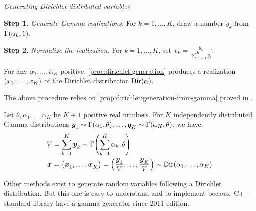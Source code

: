 \begin{proc}\label{proc:dirichlet:generation}
\emph{Generating Dirichlet distributed variables}

\textbf{Step 1.} \emph{Generate Gamma realizations.} For $k=1,\ldots,K$, draw a number $y_k$ from $\Gamma\bracket{\alpha_k,1}$.

\textbf{Step 2.} \emph{Normalize the realization.} For $k=1,\ldots,K$, set $x_k=\frac{y_k}{\sum_{\ell=1}^K y_{\ell}}$.
\end{proc}


\begin{prop}
For any $\alpha_1,\ldots,\alpha_K$ positive, \cref{proc:dirichlet:generation} produces a realization $\bracket{x_1,\ldots,x_K}$ of the Dirichlet distribution $\Dir\bracket{\alpha}$.
\end{prop}


The above procedure relies on \cref{prop:dirichlet:generation-from-gamma} proved in \cite{Devroye1986}.

\begin{prop}\label{prop:dirichlet:generation-from-gamma}
Let $\theta,\alpha_1,\ldots,\alpha_K$ be $K+1$ positive real numbers.
For $K$ independently distributed Gamma distributions
$\va y_1\sim\Gamma\bracket{\alpha_1,\theta},\ldots,\va y_K\sim\Gamma\bracket{\alpha_K,\theta}$,
we have:
\begin{subequations}
  \begin{align}
    V &= \sum_{k=1}^K \va y_k \sim \Gamma\bracket{\sum_{k=1}^K \alpha_k,\theta}
    \\
    \va x &= \bracket{\va x_1,\ldots,\va x_K} = \bracket{\frac{\va y_1}{V},\ldots,\frac{\va y_K}{V}} \sim \Dir\bracket{\alpha_1,\ldots,\alpha_K}
  \end{align}
\end{subequations}
\end{prop}

Other methods exist to generate random variables following a Dirichlet distribution.
But this one is easy to understand and to implement because C++ standard library have a gamma generator since 2011 edition.


